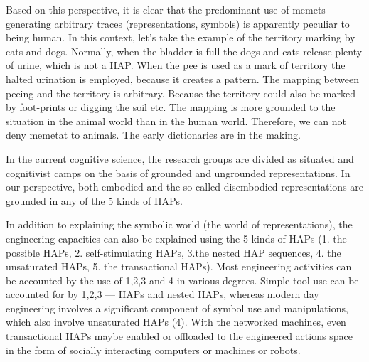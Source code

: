 Based on this perspective, it is clear that the predominant use of memets generating arbitrary traces (representations, symbols) is apparently peculiar to being human. In this context, let's take the example of the territory marking by cats and dogs. Normally, when the bladder is full the dogs and cats release plenty of urine, which is not a HAP. When the pee is used as a mark of territory the halted urination is employed, because it creates a pattern. The mapping between peeing and the territory is arbitrary. Because the territory could also be marked by foot-prints or digging the soil etc. The mapping is more grounded to the situation in the animal world than in the human world. Therefore, we can not deny memetat to animals. The early dictionaries are in the making.

In the current cognitive science, the research groups are divided as situated and cognitivist camps on the basis of grounded and ungrounded representations. In our perspective, both embodied and the so called disembodied representations are grounded in any of the 5 kinds of HAPs.

In addition to explaining the symbolic world (the world of representations), the engineering capacities can also be explained using the 5 kinds of HAPs (1. the possible HAPs, 2. self-stimulating HAPs, 3.the nested HAP sequences, 4. the unsaturated HAPs, 5. the transactional HAPs). Most engineering activities can be accounted by the use of 1,2,3 and 4 in various degrees. Simple tool use can be accounted for by 1,2,3 --- HAPs and nested HAPs, whereas modern day engineering involves a significant component of symbol use and manipulations, which also involve unsaturated HAPs (4). With the networked machines, even transactional HAPs maybe enabled or offloaded to the engineered actions space in the form of socially interacting computers or machines or robots. 

